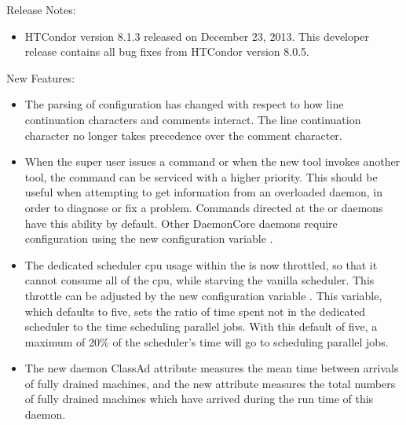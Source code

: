 \noindent Release Notes:

\begin{itemize}

\item HTCondor version 8.1.3 released on December 23, 2013.
This developer release contains all bug fixes from HTCondor version 8.0.5.

\end{itemize}


\noindent New Features:

\begin{itemize}

\item The parsing of configuration has changed with respect to how
line continuation characters and comments interact.
The line continuation character no longer takes precedence over the
comment character.

\item When the super user issues a command 
or when the new  tool invokes another tool,
the command can be serviced with a higher priority. 
This should be useful when attempting to get information from an
overloaded daemon, in order to diagnose or fix a problem.
Commands directed at the  or  daemons 
have this ability by default.
Other DaemonCore daemons require configuration using the new 
configuration variable
.

\item The dedicated scheduler cpu usage within the  is now
throttled, so that it cannot consume all of the cpu, while starving the vanilla
scheduler.  This throttle can be adjusted by the new configuration variable
.  
This variable, which defaults to five,
sets the ratio of time spent not in the dedicated scheduler to the 
time scheduling parallel jobs.  
With this default of five, 
a maximum of 20\% of the scheduler's time will go to scheduling
parallel jobs.

\item The new  daemon ClassAd attribute 
measures the mean time between arrivals of fully drained machines,
and the new attribute  
measures the total numbers of fully drained machines
which have arrived during the run time of this  daemon.


\end{itemize}
